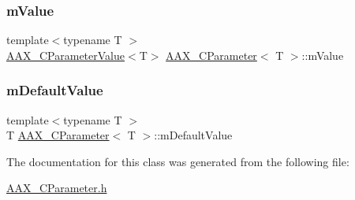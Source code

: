 \mbox{\label{a01537_a039040b844bda418b110f38016757dd3}} 
\subsubsection{\texorpdfstring{mValue}{mValue}}
{\footnotesize\ttfamily template$<$typename T $>$ \\
\mbox{\hyperlink{a01533}{A\+A\+X\+\_\+\+C\+Parameter\+Value}}$<$T$>$ \mbox{\hyperlink{a01537}{A\+A\+X\+\_\+\+C\+Parameter}}$<$ T $>$\+::m\+Value\hspace{0.3cm}{\ttfamily [protected]}}

\mbox{\label{a01537_a1ecf6a063aa9c4335470cad963125ebb}} 
\subsubsection{\texorpdfstring{mDefaultValue}{mDefaultValue}}
{\footnotesize\ttfamily template$<$typename T $>$ \\
T \mbox{\hyperlink{a01537}{A\+A\+X\+\_\+\+C\+Parameter}}$<$ T $>$\+::m\+Default\+Value\hspace{0.3cm}{\ttfamily [protected]}}



The documentation for this class was generated from the following file\+:\begin{DoxyCompactItemize}
\item 
\mbox{\hyperlink{a00455}{A\+A\+X\+\_\+\+C\+Parameter.\+h}}\end{DoxyCompactItemize}
